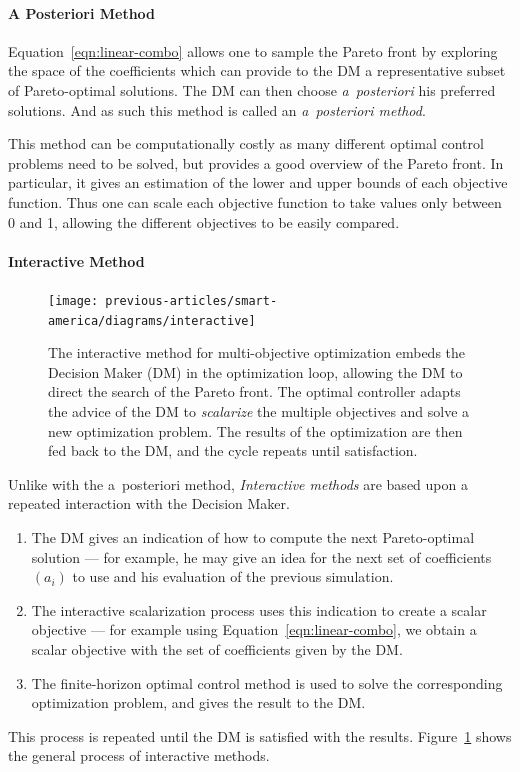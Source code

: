 			\paragraph{A Posteriori Method}
				Equation~\eqref{eqn:linear-combo} allows one to sample the Pareto front by exploring the space of the coefficients which can provide to the DM a representative subset of Pareto-optimal solutions. The DM can then choose {\it a~posteriori} his preferred solutions. And as such this method is called an \emph{a~posteriori method}.

				This method can be computationally costly as many different optimal control problems need to be solved, but provides a good overview of the Pareto front. In particular, it gives an estimation of the lower and upper bounds of each objective function. Thus one can scale each objective function to take values only between 0 and 1, allowing the different objectives to be easily compared.
			\paragraph{Interactive Method}
				\begin{figure}[ht]
					\centering
					  \texttt{[image: previous-articles/smart-america/diagrams/interactive]}
					\caption[The interactive method for multi-objective optimization embeds the Decision Maker (DM) in the optimization loop, allowing the DM to direct the search of the Pareto front.]{The interactive method for multi-objective optimization embeds the Decision Maker (DM) in the optimization loop, allowing the DM to direct the search of the Pareto front. The optimal controller adapts the advice of the DM to \emph{scalarize} the multiple objectives and solve a new optimization problem. The results of the optimization are then fed back to the DM, and the cycle repeats until satisfaction.}
					\label{fig:interactive}
				\end{figure}
				Unlike with the a~posteriori method, \emph{Interactive methods} are based upon a repeated interaction with the Decision Maker.
				\begin{enumerate}
					\item The DM gives an indication of how to compute the next Pareto-optimal solution --- for example, he may give an idea for the next set of coefficients $(a_i)$ to use and his evaluation of the previous simulation.
					\item The interactive scalarization process uses this indication to create a scalar objective --- for example using Equation~\eqref{eqn:linear-combo}, we obtain a scalar objective with the set of coefficients given by the DM.
					\item The finite-horizon optimal control method is used to solve the corresponding optimization problem, and gives the result to the DM.
				\end{enumerate}
				This process is repeated until the DM is satisfied with the results. Figure~\ref{fig:interactive} shows the general process of interactive methods.

